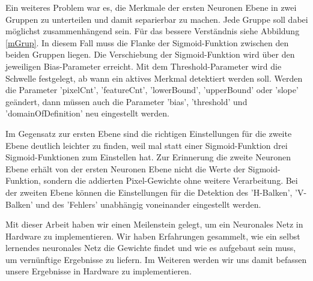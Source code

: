Ein weiteres Problem war es, die Merkmale der ersten Neuronen Ebene in zwei Gruppen zu unterteilen und damit separierbar zu machen. Jede Gruppe soll dabei möglichst zusammenhängend sein. Für das bessere Verständnis siehe Abbildung \ref{mGrup}. In diesem Fall muss die Flanke der Sigmoid-Funktion zwischen den beiden Gruppen liegen. Die Verschiebung der Sigmoid-Funktion wird über den jeweiligen Bias-Parameter erreicht. Mit dem Threshold-Parameter wird die Schwelle festgelegt, ab wann ein aktives Merkmal detektiert werden soll. Werden die Parameter 'pixelCnt', 'featureCnt', 'lowerBound', 'upperBound' oder 'slope' geändert, dann müssen auch die Parameter 'bias', 'threshold' und 'domainOfDefinition' neu eingestellt werden.

Im Gegensatz zur ersten Ebene sind die richtigen Einstellungen für die zweite Ebene deutlich leichter zu finden, weil mal statt einer Sigmoid-Funktion drei Sigmoid-Funktionen zum Einstellen hat. Zur Erinnerung die zweite Neuronen Ebene erhält von der ersten Neuronen Ebene nicht die Werte der Sigmoid-Funktion, sondern die addierten Pixel-Gewichte ohne weitere Verarbeitung. Bei der zweiten Ebene können die Einstellungen für die Detektion des 'H-Balken', 'V-Balken' und des 'Fehlers' unabhängig voneinander eingestellt werden.

Mit dieser Arbeit haben wir einen Meilenstein gelegt, um ein Neuronales Netz in Hardware zu implementieren. Wir haben Erfahrungen gesammelt, wie ein selbst lernendes neuronales Netz die Gewichte findet und wie es aufgebaut sein muss, um vernünftige Ergebnisse zu liefern. Im Weiteren werden wir uns damit befassen unsere Ergebnisse in Hardware zu implementieren.

